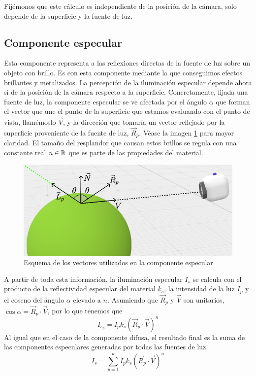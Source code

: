 Fijémonos que este cálculo es independiente de la posición de la cámara, solo depende de la superficie y la fuente de luz.

\subsection{Componente especular}

Esta componente representa a las reflexiones directas de la fuente de luz sobre un objeto con brillo. Es con esta componente mediante la que conseguimos efectos brillantes y metalizados. La percepción de la iluminación especular depende ahora sí de la posición de la cámara respecto a la superficie. Concretamente, fijada una fuente de luz, la componente especular se ve afectada por el ángulo $\alpha$ que forman el vector que une el punto de la superficie que estamos evaluando con el punto de vista, llamémoslo  $\vec V$, y la dirección que tomaría un vector reflejado por la superficie proveniente de la fuente de luz, $\vec R_p$. Véase la imagen \ref{fig:especular} para mayor claridad. El tamaño del resplandor que causan estos brillos se regula con una constante real $n\in\mathbb{R}$ que es parte de las propiedades del material.

\begin{figure} [ht]
    \centering
    \includegraphics[scale = 0.35]{img/C7/especular.png}
    \caption{Esquema de los vectores utilizados en la componente especular}
    \label{fig:especular}
\end{figure}

A partir de toda esta información, la iluminación especular $I_s$ se calcula con el producto de la reflectividad especular del material $k_s$, la intensidad de la luz $I_p$ y el coseno del ángulo $\alpha$ elevado a $n$. Asumiendo que $\vec R_p$ y $\vec V$ son unitarios, $\cos\alpha=\vec R_p\cdot \vec V$, por lo que tenemos que
\begin{equation}
    I_{s_p} = I_p k_s (\vec R_p\cdot \vec V)^n
\end{equation}   
Al igual que en el caso de la componente difusa, el resultado final es la suma de las componentes especulares generadas por todas las fuentes de luz.
\begin{equation}
    I_s = \sum_{p=1}^k I_p k_s (\vec R_p \cdot \vec V)^n
\end{equation}

